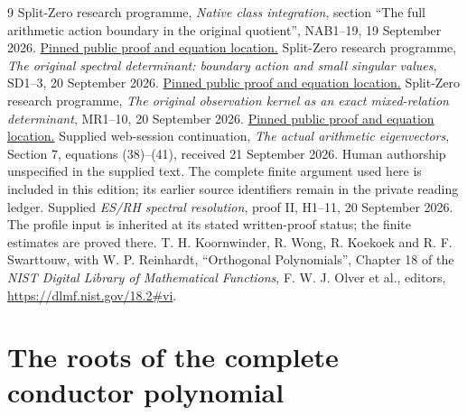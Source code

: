 \documentclass[11pt]{article}
\begin{document}
\begin{thebibliography}{9}
 Split-Zero research programme,
\emph{Native class integration}, section ``The full arithmetic action
boundary in the original quotient'', NAB1--19, 19 September 2026.
\href{https://github.com/KokunoYumeto/zeta-function-research-reader/blob/5992ad50c0f2a06921f1fcaded7b4e38097c0739/workbenches/splitzero-tandem/continuations/20260920-original-kernel-mixed-determinants/providers/09_INPUT_CUMULATIVE_PROOFS.tex#L109189}{Pinned public proof and equation location.}
 Split-Zero research programme,
\emph{The original spectral determinant: boundary action and small
singular values}, SD1--3, 20 September 2026.
\href{https://github.com/KokunoYumeto/zeta-function-research-reader/blob/5992ad50c0f2a06921f1fcaded7b4e38097c0739/workbenches/splitzero-tandem/continuations/20260920-original-kernel-mixed-determinants/providers/ORIGINAL_SPECTRAL_DETERMINANT.tex#L34}{Pinned public proof and equation location.}
 Split-Zero research programme,
\emph{The original observation kernel as an exact mixed-relation
determinant}, MR1--10, 20 September 2026.
\href{https://github.com/KokunoYumeto/zeta-function-research-reader/blob/5992ad50c0f2a06921f1fcaded7b4e38097c0739/workbenches/splitzero-tandem/continuations/20260920-original-kernel-mixed-determinants/ORIGINAL_KERNEL_MIXED_DETERMINANT.tex#L36}{Pinned public proof and equation location.}
 Supplied web-session continuation,
\emph{The actual arithmetic eigenvectors}, Section 7, equations (38)--(41),
received 21 September 2026. Human authorship unspecified in the supplied
text. The complete finite argument used here is included in this edition; its earlier source identifiers remain in the private reading ledger.
 Supplied \emph{ES/RH spectral resolution}, proof II,
H1--11, 20 September 2026. The profile input is inherited at its
stated written-proof status; the finite estimates are proved there.
 T. H. Koornwinder, R. Wong, R. Koekoek and R. F. Swarttouw, with W. P. Reinhardt,
``Orthogonal Polynomials'', Chapter 18 of the \emph{NIST Digital Library
of Mathematical Functions}, F. W. J. Olver et al., editors,
\url{https://dlmf.nist.gov/18.2#vi}.
\end{thebibliography}

\clearpage\part{The roots of the complete conductor polynomial}
\label{part:2}
\end{document}
